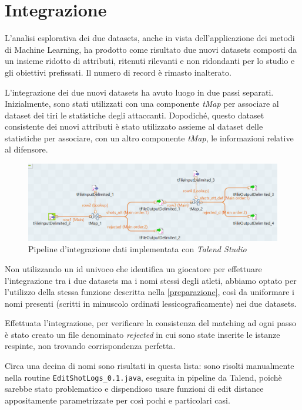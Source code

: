 \section{Integrazione}
\label{integrazione}

L’analisi esplorativa dei due datasets, anche in vista dell’applicazione dei metodi di Machine Learning, ha prodotto come risultato due nuovi datasets composti da un insieme ridotto di attributi, ritenuti rilevanti e non ridondanti per lo studio e gli obiettivi prefissati. Il numero di record è rimasto inalterato.
\par
L’integrazione dei due nuovi datasets ha avuto luogo in due passi separati. Inizialmente, sono stati utilizzati con una componente \textit{tMap} per associare al dataset dei tiri le statistiche degli attaccanti. Dopodiché, questo dataset consistente dei nuovi attributi è stato utilizzato assieme al dataset delle statistiche per associare, con un altro componente \textit{tMap}, le informazioni relative al difensore.
\par
\begin{figure}[H]
\caption{Pipeline d'integrazione dati implementata con \textit{Talend Studio}}
	\includegraphics[width=\linewidth]{pipeline_talend1.png}
\end{figure}

Non utilizzando un id univoco che identifica un giocatore per effettuare l’integrazione tra i due datasets ma i nomi stessi degli atleti, abbiamo optato per l’utilizzo della stessa funzione descritta nella \autoref{preparazione}, così da uniformare i nomi presenti (scritti in minuscolo ordinati lessicograficamente) nei due datasets. 
\par



Effettuata l’integrazione, per verificare la consistenza del matching ad ogni passo è stato creato un file denominato \textit{rejected} in cui sono state inserite le istanze respinte, non trovando corrispondenza perfetta.
\par
Circa una decina di nomi sono risultati in questa lista: sono risolti manualmente nella routine \texttt{EditShotLogs\_0.1.java}, eseguita in pipeline da Talend, poichè sarebbe stato problematico e dispendioso usare funzioni di edit distance appositamente parametrizzate per così pochi e particolari casi.

